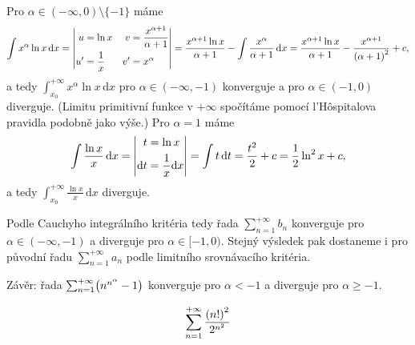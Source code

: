\documentclass[answers]{exam}
\let\originalleft\left
\let\originalright\right
\renewcommand{\left}{\mathopen{}\mathclose\bgroup\originalleft}
\renewcommand{\right}{\aftergroup\egroup\originalright}
\begin{document}
\begin{questions}
\begin{solution}
  	Pro $\alpha \in (-\infty, 0) \setminus \{ -1 \}$ máme
  	\begin{equation*}
  		\int x^{\alpha} \ln x \, \mathrm{d} x
  		=
      \left| 
        \begin{aligned}
          u &= \ln x & v &= \frac{x^{\alpha + 1}}{\alpha + 1}
          \\
          u' &= \frac{1}{x} & v' &= x^{\alpha}
        \end{aligned}
      \right|
      =
      \frac{x^{\alpha + 1} \ln x}{\alpha + 1}
      -
      \int \frac{x^{\alpha}}{\alpha + 1} \, \mathrm{d} x
      =
      \frac{x^{\alpha + 1} \ln x}{\alpha + 1}
      -
      \frac{x^{\alpha + 1}}{\left( \alpha + 1 \right)^2}
      +
      c,
  	\end{equation*}
  	a tedy $\int_{x_0}^{+\infty} x^{\alpha} \ln x \, \mathrm{d}x$ pro $\alpha \in (-\infty, -1)$ konverguje a pro $\alpha \in (-1, 0)$ diverguje. (Limitu primitivní funkce v $+\infty$ spočítáme pomocí l'Hôspitalova pravidla podobně jako výše.) Pro $\alpha = 1$ máme
  	\begin{equation*}
  		\int \frac{\ln x}{x} \, \mathrm{d} x
  		=
      \left| 
        \begin{aligned}
          t &= \ln x
          \\
          \mathrm{d}t &= \frac{1}{x} \mathrm{d}x
        \end{aligned}
      \right|
      =
      \int t \, \mathrm{d} t
      =
      \frac{t^2}{2} + c
      =
      \frac{1}{2} \ln^2 x + c,
  	\end{equation*}  	
  	a tedy $\int_{x_0}^{+\infty} \frac{\ln x}{x} \, \mathrm{d}x$ diverguje.
  	
  	Podle Cauchyho integrálního kritéria tedy řada $\sum_{n = 1}^{+\infty} b_n$ konverguje pro $\alpha \in (-\infty, -1)$ a diverguje pro $\alpha \in [-1, 0)$. Stejný výsledek pak dostaneme i pro původní řadu $\sum_{n = 1}^{+\infty} a_n$ podle limitního srovnávacího kritéria.
  	
  	Závěr: řada $\sum_{n = 1}^{+\infty} \left( n^{n^{\alpha}} - 1 \right)$ konverguje pro $\alpha < -1$ a diverguje pro $\alpha \ge -1$.
  \end{solution}

  \question
  \begin{equation*}
    \sum_{n = 1}^{+\infty}
		\frac{\left( n! \right)^2}{2^{n^2}}
  \end{equation*}
  

\end{questions}
\end{document}
